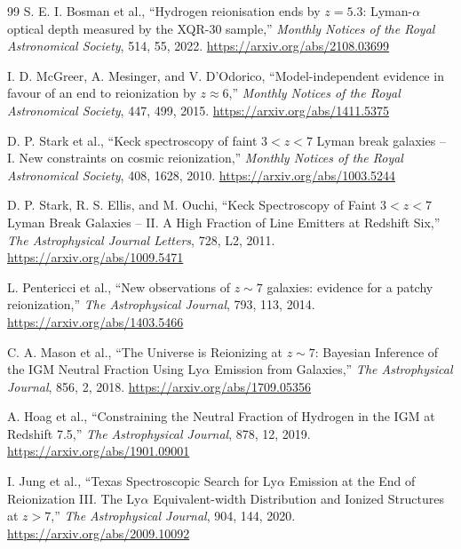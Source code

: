 \begin{thebibliography}{99}
S. E. I. Bosman et al.,
``Hydrogen reionisation ends by $z=5.3$: Lyman-$\alpha$ optical depth measured by the XQR-30 sample,''
\emph{Monthly Notices of the Royal Astronomical Society}, 514, 55, 2022.
\url{https://arxiv.org/abs/2108.03699}

I. D. McGreer, A. Mesinger, and V. D'Odorico,
``Model-independent evidence in favour of an end to reionization by $z\approx6$,''
\emph{Monthly Notices of the Royal Astronomical Society}, 447, 499, 2015.
\url{https://arxiv.org/abs/1411.5375}

D. P. Stark et al.,
``Keck spectroscopy of faint $3<z<7$ Lyman break galaxies -- I. New constraints on cosmic reionization,''
\emph{Monthly Notices of the Royal Astronomical Society}, 408, 1628, 2010.
\url{https://arxiv.org/abs/1003.5244}

D. P. Stark, R. S. Ellis, and M. Ouchi,
``Keck Spectroscopy of Faint $3<z<7$ Lyman Break Galaxies -- II. A High Fraction of Line Emitters at Redshift Six,''
\emph{The Astrophysical Journal Letters}, 728, L2, 2011.
\url{https://arxiv.org/abs/1009.5471}

L. Pentericci et al.,
``New observations of $z\sim7$ galaxies: evidence for a patchy reionization,''
\emph{The Astrophysical Journal}, 793, 113, 2014.
\url{https://arxiv.org/abs/1403.5466}

C. A. Mason et al.,
``The Universe is Reionizing at $z\sim7$: Bayesian Inference of the IGM Neutral Fraction Using Ly$\alpha$ Emission from Galaxies,''
\emph{The Astrophysical Journal}, 856, 2, 2018.
\url{https://arxiv.org/abs/1709.05356}

A. Hoag et al.,
``Constraining the Neutral Fraction of Hydrogen in the IGM at Redshift 7.5,''
\emph{The Astrophysical Journal}, 878, 12, 2019.
\url{https://arxiv.org/abs/1901.09001}

I. Jung et al.,
``Texas Spectroscopic Search for Ly$\alpha$ Emission at the End of Reionization III. The Ly$\alpha$ Equivalent-width Distribution and Ionized Structures at $z>7$,''
\emph{The Astrophysical Journal}, 904, 144, 2020.
\url{https://arxiv.org/abs/2009.10092}


\end{thebibliography}
